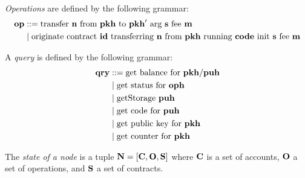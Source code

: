 \documentclass[a4paper]{llncs}
\begin{document}
\begin{definition}%
  \emph{Operations} are defined by the following grammar:
  \begin{align*}
    \OP &::= \TRANSFER[\STRING]\NTEZ\PKH{\PKH'}\MTEZ
    \\&\mid \ORIGINATE\ID\NTEZ\PKH\CODE\STRING\MTEZ
  \end{align*}
\end{definition}

\begin{definition}%
A \emph{query} is defined by the following grammar:
\begin{align*}
  \QRY & ::= \GETBALANCE {\PKH / \PUH}
  \\&\mid \GETSTATUS\OPH
  \\&\mid \GETSTORAGE\PUH
  \\&\mid \GETCODE\PUH 
  \\&\mid \GETPUBLICKEY\PKH
  \\&\mid \GETCOUNTER\PKH
\end{align*}


\end{definition}
 \begin{definition}%
   The \emph{state of a node} is a tuple
   $\NODE = [\ACCOUNTS, \OPERATIONS, \CONTRACTS]$ where $\ACCOUNTS$ is a set of accounts,
   $\OPERATIONS$ a set of operations, and $\CONTRACTS$  a set of contracts. 
\end{definition}
\end{document}

